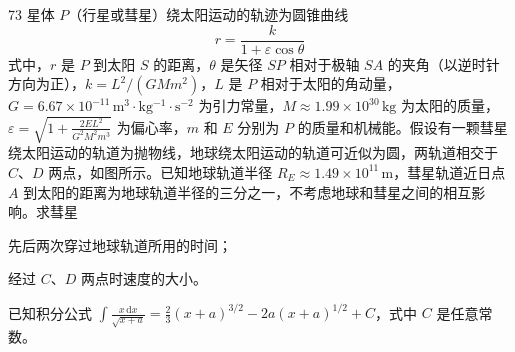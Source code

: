 \begin{problem}[第34届物理竞赛复赛][彗星轨道]{73}
    星体 $P$（行星或彗星）绕太阳运动的轨迹为圆锥曲线
    \begin{equation}
        r = \frac{k}{1 + \varepsilon \cos \theta}
    \end{equation}
    式中，$r$ 是 $P$ 到太阳 $S$ 的距离，$\theta$ 是矢径 $SP$ 相对于极轴 $SA$ 的夹角（以逆时针方向为正），$k = L^{2}/(GMm^{2})$，$L$ 是 $P$ 相对于太阳的角动量，$G = 6.67 \times 10^{-11}\,\mathrm{m^{3}\cdot kg^{-1}\cdot s^{-2}}$ 为引力常量，$M \approx 1.99 \times 10^{30}\,\mathrm{kg}$ 为太阳的质量，$\varepsilon = \sqrt{1 + \frac{2EL^{2}}{G^{2}M^{2}m^{3}}}$ 为偏心率，$m$ 和 $E$ 分别为 $P$ 的质量和机械能。假设有一颗彗星绕太阳运动的轨道为抛物线，地球绕太阳运动的轨道可近似为圆，两轨道相交于 $C$、$D$ 两点，如图所示。已知地球轨道半径 $R_{E} \approx 1.49 \times 10^{11}\,\mathrm{m}$，彗星轨道近日点 $A$ 到太阳的距离为地球轨道半径的三分之一，不考虑地球和彗星之间的相互影响。求彗星
    \begin{subproblem}
        先后两次穿过地球轨道所用的时间；
    \end{subproblem}
    \begin{subproblem}
        经过 $C$、$D$ 两点时速度的大小。
    \end{subproblem}
    已知积分公式 $\displaystyle \int \frac{x\,\mathrm{d}x}{\sqrt{x+a}} = \frac{2}{3}(x+a)^{3/2} - 2a(x+a)^{1/2} + C$，式中 $C$ 是任意常数。
\end{problem}